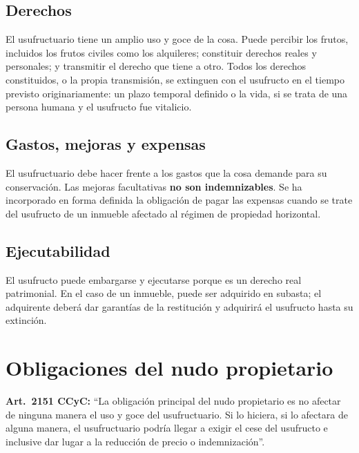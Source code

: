 \documentclass[12pt,oneside]{book}
\begin{document}
\subsection{Derechos}

El usufructuario tiene un amplio uso y goce de la cosa. Puede percibir los frutos, incluidos los frutos civiles como los alquileres; constituir derechos reales y personales; y transmitir el derecho que tiene a otro. Todos los derechos constituidos, o la propia transmisión, se extinguen con el usufructo en el tiempo previsto originariamente: un plazo temporal definido o la vida, si se trata de una persona humana y el usufructo fue vitalicio.

\subsection{Gastos, mejoras y expensas}

El usufructuario debe hacer frente a los gastos que la cosa demande para su conservación.
Las mejoras facultativas \textbf{no son indemnizables}. Se ha incorporado en forma definida la obligación de pagar las expensas cuando se trate del usufructo de un inmueble afectado al régimen de propiedad horizontal.

\subsection{Ejecutabilidad}

El usufructo puede embargarse y ejecutarse porque es un derecho real patrimonial. En el caso de un inmueble, puede ser adquirido en subasta; el adquirente deberá dar garantías de la restitución y adquirirá el usufructo hasta su extinción.

\section{Obligaciones del nudo propietario}

\begin{important}
\textbf{Art.~2151 CCyC:} ``La obligación principal del nudo propietario es no afectar de ninguna manera el uso y goce del usufructuario. Si lo hiciera, si lo afectara de alguna manera, el usufructuario podría llegar a exigir el cese del usufructo e inclusive dar lugar a la reducción de precio o indemnización''.
\end{important}
\end{document}
